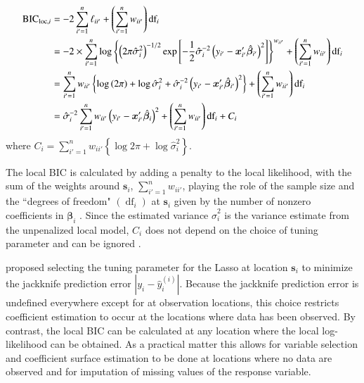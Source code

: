 \documentclass[authoryear, review, 11pt]{elsarticle}
\DeclareMathOperator*{\df}{\mbox{df}}
\begin{document}
	\begin{align}
		\mbox{BIC}_{\text{loc}, i} &= -2 \sum_{i'=1}^n \ell_{ii'}  + \left( \sum_{i'=1}^n w_{ii'} \right) \mbox{df}_i\notag\\
		&= -2 \times \sum_{i'=1}^n \log \left\{ \left(2 \pi \hat{\sigma}_i^2\right)^{-1/2} \exp \left[-\frac{1}{2} \hat{\sigma}_i^{-2} \left(y_{i'} - \bm{x}_{i'}' \hat{\bm{\beta}}_{i'} \right)^2\right] \right\}^{w_{ii'}} + \left( \sum_{i'=1}^n w_{ii'} \right) \mbox{df}_i\notag\\
		&= \sum_{i'=1}^n w_{ii'} \left\{ \log \left(2 \pi \right) + \log \hat{\sigma}_i^2 + \hat{\sigma}_i^{-2} \left(y_{i'} - \bm{x}_{i'}' \hat{\bm{\beta}}_{i'} \right)^2 \right\} + \left( \sum_{i'=1}^n w_{ii'} \right) \mbox{df}_i \notag\\
		&= \hat{\sigma}_i^{-2} \sum_{i'=1}^n w_{ii'} \left( y_{i'} - \bm{x}'_{i'} \hat{\bm{\beta}}_i \right)^2 + \left( \sum_{i'=1}^n w_{ii'} \right) \mbox{df}_i + C_i
	\end{align}
	where $C_i = \sum \limits_{i'=1}^n w_{ii'} \left\{\log{2\pi} + \log{\hat{\sigma}_i^2} \right\}$.
	
	 The local BIC is calculated by adding a penalty to the local likelihood, with the sum of the weights around $\bm{s}_i$, $\sum_{i'=1}^n w_{ii'}$, playing the role of the sample size and the ``degrees of freedom" $\left( \df_i \right)$ at $\bm{s}_i$ given by the number of nonzero coefficients in $\bm{\beta}_i$ \citep{Zou:2007}. Since the estimated variance $\hat{\sigma}_i^2$ is the variance estimate from the unpenalized local model, $C_i$ does not depend on the choice of tuning parameter and can be ignored \citep{Zou:2007}.
	
	\cite{Wheeler:2009} proposed selecting the tuning parameter for the Lasso at location $\bm{s}_i$ to minimize the jackknife prediction error $|y_i - \hat{y}_i^{(i)}|$. Because the jackknife prediction error is undefined everywhere except for at observation locations, this choice restricts coefficient estimation to occur at the locations where data has been observed. By contrast, the local BIC can be calculated at any location where the local log-likelihood can be obtained. As a practical matter this allows for variable selection and coefficient surface estimation to be done at locations where no data are observed and for imputation of missing values of the response variable.
	
\end{document}
